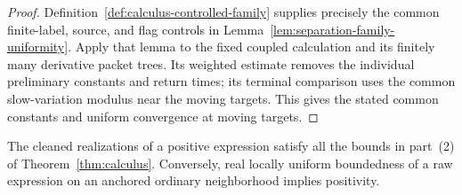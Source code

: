 \begin{proof}
Definition~\ref{def:calculus-controlled-family} supplies precisely the
common finite-label, source, and flag controls in
Lemma~\ref{lem:separation-family-uniformity}.  Apply that lemma to the
fixed coupled calculation and its finitely many derivative packet trees.
Its weighted estimate removes the individual preliminary constants and
return times; its terminal comparison uses the common slow-variation
modulus near the moving targets.  This gives the stated common constants
and uniform convergence at moving targets.
\end{proof}

\begin{lemma}
\label{lem:calculus-positive-bounds}
The cleaned realizations of a positive expression satisfy all the bounds in
part~(2) of Theorem~\ref{thm:calculus}.  Conversely, real locally uniform
boundedness of a raw expression on an anchored ordinary neighborhood
implies positivity.
\end{lemma}

